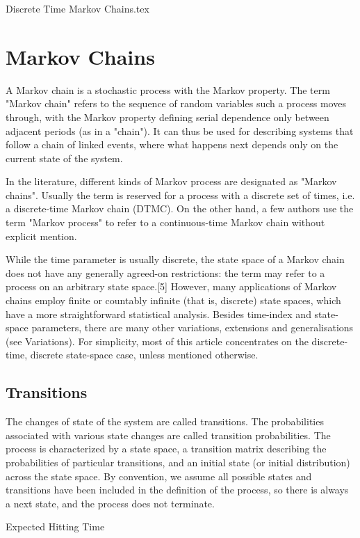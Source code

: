 Discrete Time Markov Chains.tex


\section{Markov Chains}
A Markov chain is a stochastic process with the Markov property. The term "Markov chain" refers to the sequence of random variables such a process moves through, with the Markov property defining serial dependence only between adjacent periods (as in a "chain"). It can thus be used for describing systems that follow a chain of linked events, where what happens next depends only on the current state of the system.

In the literature, different kinds of Markov process are designated as "Markov chains". Usually the term is reserved for a process with a discrete set of times, i.e. a discrete-time Markov chain (DTMC). On the other hand, a few authors use the term "Markov process" to refer to a continuous-time Markov chain without explicit mention.

While the time parameter is usually discrete, the state space of a Markov chain does not have any generally agreed-on restrictions: the term may refer to a process on an arbitrary state space.[5] However, many applications of Markov chains employ finite or countably infinite (that is, discrete) state spaces, which have a more straightforward statistical analysis. Besides time-index and state-space parameters, there are many other variations, extensions and generalisations (see Variations). For simplicity, most of this article concentrates on the discrete-time, discrete state-space case, unless mentioned otherwise.

\subsection{Transitions}
The changes of state of the system are called transitions. The probabilities associated with various state changes are called transition probabilities. The process is characterized by a state space, a transition matrix describing the probabilities of particular transitions, and an initial state (or initial distribution) across the state space. By convention, we assume all possible states and transitions have been included in the definition of the process, so there is always a next state, and the process does not terminate.

Expected Hitting Time
